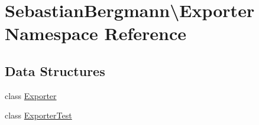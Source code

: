 \hypertarget{namespace_sebastian_bergmann_1_1_exporter}{}\section{Sebastian\+Bergmann\textbackslash{}Exporter Namespace Reference}
\label{namespace_sebastian_bergmann_1_1_exporter}
\subsection*{Data Structures}
\begin{DoxyCompactItemize}
\item 
class \mbox{\hyperlink{class_sebastian_bergmann_1_1_exporter_1_1_exporter}{Exporter}}
\item 
class \mbox{\hyperlink{class_sebastian_bergmann_1_1_exporter_1_1_exporter_test}{Exporter\+Test}}
\end{DoxyCompactItemize}
